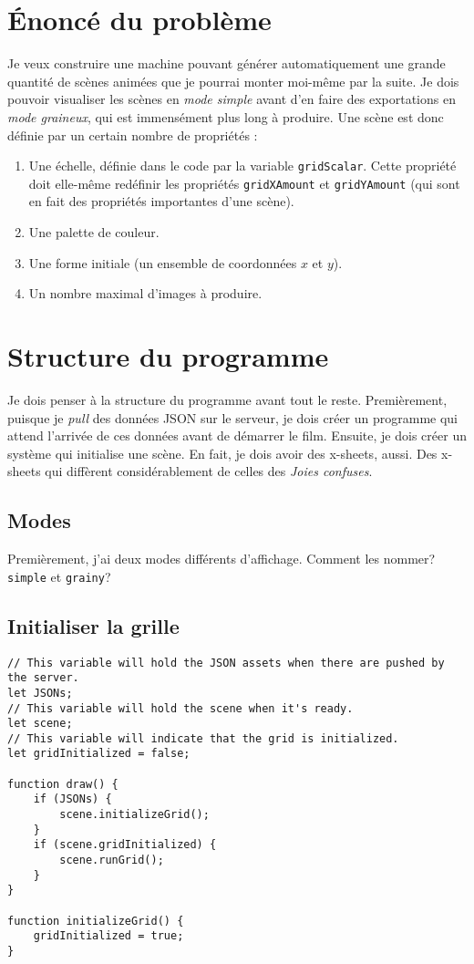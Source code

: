 
\section{Énoncé du problème}
\noindent Je veux construire une machine pouvant générer automatiquement une grande quantité de scènes animées que je pourrai monter moi-même par la suite. Je dois pouvoir visualiser les scènes en \textit{mode simple} avant d'en faire des exportations en \textit{mode graineux}, qui est immensément plus long à produire. Une scène est donc définie par un certain nombre de propriétés : 

\begin{enumerate}
\item Une échelle, définie dans le code par la variable \lstinline|gridScalar|. Cette propriété doit elle-même redéfinir les propriétés \lstinline|gridXAmount| et \lstinline|gridYAmount| (qui sont en fait des propriétés importantes d'une scène).
\item Une palette de couleur.
\item Une forme initiale (un ensemble de coordonnées $x$ et $y$).
\item Un nombre maximal d'images à produire.

\end{enumerate}

\newpage
\section{Structure du programme}
\noindent Je dois penser à la structure du programme avant tout le reste. Premièrement, puisque je \textit{pull} des données JSON sur le serveur, je dois créer un programme qui attend l'arrivée de ces données avant de démarrer le film. Ensuite, je dois créer un système qui initialise une scène. En fait, je dois avoir des x-sheets, aussi. Des x-sheets qui diffèrent considérablement de celles des \textit{Joies confuses}.

\subsection{Modes}
\noindent Premièrement, j'ai deux modes différents d'affichage. Comment les nommer? \lstinline|simple| et \lstinline|grainy|?

\subsection{Initialiser la grille}
\begin{lstlisting}
// This variable will hold the JSON assets when there are pushed by the server.
let JSONs;
// This variable will hold the scene when it's ready.
let scene;
// This variable will indicate that the grid is initialized.
let gridInitialized = false;

function draw() {
    if (JSONs) {
        scene.initializeGrid();
    }
    if (scene.gridInitialized) {
        scene.runGrid();
    }
}

function initializeGrid() {
    gridInitialized = true;
} 

\end{lstlisting}

